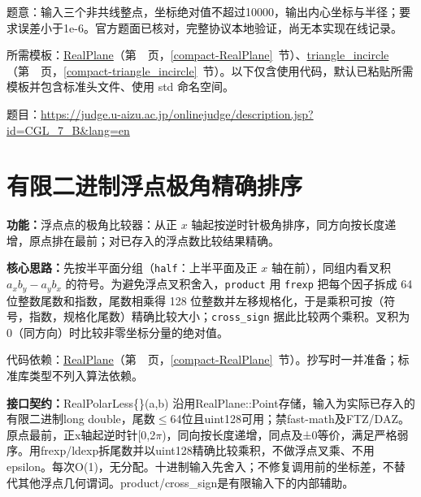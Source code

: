 题意：输入三个非共线整点，坐标绝对值不超过10000，输出内心坐标与半径；要求误差小于1e-6。官方题面已核对，完整协议本地验证，尚无本实现在线记录。

所需模板：\hyperref[compact-RealPlane]{RealPlane}（第~\pageref{compact-RealPlane}~页，\ref{compact-RealPlane}~节）、\hyperref[compact-triangle_incircle]{triangle\_\allowbreak{}incircle}（第~\pageref{compact-triangle_incircle}~页，\ref{compact-triangle_incircle}~节）。以下仅含使用代码，默认已粘贴所需模板并包含标准头文件、使用 std 命名空间。

题目：\url{https://judge.u-aizu.ac.jp/onlinejudge/description.jsp?id=CGL_7_B&lang=en}



\section{有限二进制浮点极角精确排序}\label{compact-RealPolarLess}

\noindent\textbf{功能：}\allowbreak 浮点点的极角比较器：从正 $x$ 轴起按逆时针极角排序，同方向按长度递增，原点排在最前；对已存入的浮点数比较结果精确。

\textbf{核心思路：}\allowbreak 先按半平面分组（\texttt{half}：上半平面及正 $x$ 轴在前），同组内看叉积 $a_xb_y-a_yb_x$ 的符号。为避免浮点叉积舍入，\texttt{product} 用 \texttt{frexp} 把每个因子拆成 64 位整数尾数和指数，尾数相乘得 128 位整数并左移规格化，于是乘积可按（符号，指数，规格化尾数）精确比较大小；\texttt{cross\_sign} 据此比较两个乘积。叉积为 0（同方向）时比较非零坐标分量的绝对值。

代码依赖：\hyperref[compact-RealPlane]{RealPlane}（第~\pageref{compact-RealPlane}~页，\ref{compact-RealPlane}~节）。抄写时一并准备；标准库类型不列入算法依赖。

{\sloppy{}\noindent\textbf{接口契约：}RealPolarLess\{\}(a,b) 沿用RealPlane::Point存储，输入为实际已存入的有限二进制long double，尾数$\le$64位且uint128可用；禁fast-math及FTZ/DAZ。原点最前，正x轴起逆时针[0,2$\pi$)，同向按长度递增，同点及±0等价，满足严格弱序。用frexp/ldexp拆尾数并以uint128精确比较乘积，不做浮点叉乘、不用epsilon。每次O(1)，无分配。十进制输入先舍入；不修复调用前的坐标差，不替代其他浮点几何谓词。product/cross\_sign是有限输入下的内部辅助。\par}

\Needspace{532pt}



